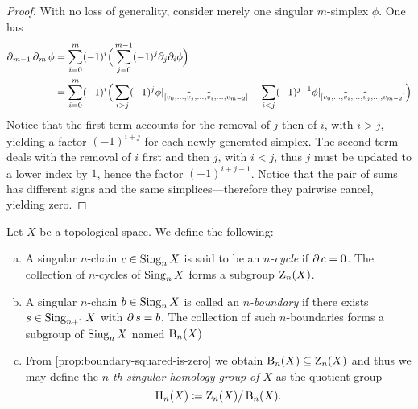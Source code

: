\begin{proof}
With no loss of generality, consider merely one singular \(m\)-simplex
\(\phi\). One has
\begin{align*}
  \operatorname{\partial}_{m-1} \operatorname{\partial}_m \phi
  &= \sum_{i=0}^m (-1)^i
  \Big( \sum_{j=0}^{m-1} (-1)^j \partial_j \partial_i \phi \Big) \\
  &= \sum_{i=0}^m (-1)^i
  \Big(
    \sum_{i > j} (-1)^j
    \phi|_{[v_0, \dots, \widehat v_j, \dots, \widehat v_i, \dots, v_{m-2}]}
  + \sum_{i < j} (-1)^{j-1}
      \phi|_{[v_0, \dots, \widehat v_i, \dots, \widehat v_j, \dots, v_{m-2}]}
      \Big) \\
\end{align*}
Notice that the first term accounts for the removal of \(j\) then of \(i\), with
\(i > j\), yielding a factor \((-1)^{i + j}\) for each newly generated
simplex. The second term deals with the removal of \(i\) first and then \(j\),
with \(i < j\), thus \(j\) must be updated to a lower index by \(1\), hence the
factor \((-1)^{i + j - 1}\). Notice that the pair of sums has different signs
and the same simplices---therefore they pairwise cancel, yielding zero.
\end{proof}

\begin{definition}
\label{def:cycle-boundary-homology}
Let \(X\) be a topological space. We define the following:
\begin{enumerate}[(a)]\setlength\itemsep{0em}
\item A singular \(n\)-chain \(c \in \operatorname{Sing}_n X\) is said to be an
  \emph{\(n\)-cycle} if \(\operatorname{\partial} c = 0\). The collection of \(n\)-cycles of
  \(\operatorname{Sing}_n X\) forms a subgroup \(\operatorname{Z}_n(X)\).

\item A singular \(n\)-chain \(b \in \operatorname{Sing}_n X\) is called an
  \emph{\(n\)-boundary} if there exists \(s \in \operatorname{Sing}_{n+1} X\) with
  \(\operatorname{\partial} s = b\). The collection of such \(n\)-boundaries forms a subgroup of
  \(\operatorname{Sing}_n X\) named \(\operatorname{B}_n(X)\)

\item From \cref{prop:boundary-squared-is-zero} we obtain
  \(\operatorname{B}_n(X) \subseteq \operatorname{Z}_n(X)\) and thus we may define the \emph{\(n\)-th
    singular homology group of \(X\)} as the quotient group
  \[
  \operatorname{H}_n(X) \coloneq \operatorname{Z}_n(X) / \operatorname{B}_n(X).
  \]
\end{enumerate}
\end{definition}

